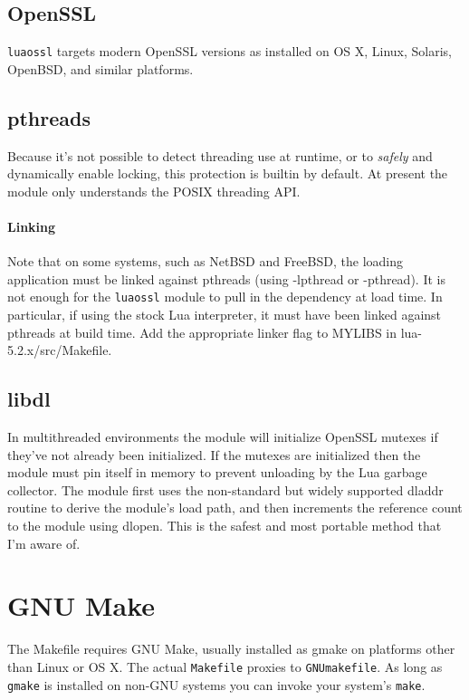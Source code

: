 \documentclass[11pt, oneside]{memoir}
\newcommand*{\luaossl}[0]{\texttt{luaossl}\xspace}
\begin{document}
\subsection{OpenSSL}

\luaossl targets modern OpenSSL versions as installed on OS X, Linux, Solaris, OpenBSD, and similar platforms.

\subsection{pthreads}

Because it's not possible to detect threading use at runtime, or to \emph{safely} and dynamically enable locking, this protection is builtin by default. At present the module only understands the POSIX threading API.

\paragraph{Linking}
Note that on some systems, such as NetBSD and FreeBSD, the loading application must be linked against pthreads (using -lpthread or -pthread). It is not enough for the \luaossl module to pull in the dependency at load time. In particular, if using the stock Lua interpreter, it must have been linked against pthreads at build time. Add the appropriate linker flag to MYLIBS in lua-5.2.x/src/Makefile.

\subsection{libdl}

In multithreaded environments the module will initialize OpenSSL mutexes if they've not already been initialized. If the mutexes are initialized then the module must pin itself in memory to prevent unloading by the Lua garbage collector. The module first uses the non-standard but widely supported dladdr routine to derive the module's load path, and then increments the reference count to the module using dlopen. This is the safest and most portable method that I'm aware of.

\section{GNU Make}

The Makefile requires GNU Make, usually installed as gmake on platforms other than Linux or OS X. The actual \texttt{Makefile} proxies to \texttt{GNUmakefile}. As long as \texttt{gmake} is installed on non-GNU systems you can invoke your system's \texttt{make}.
\end{document}
